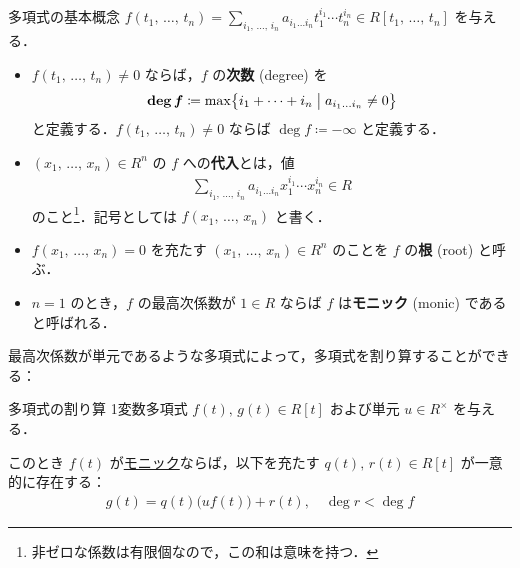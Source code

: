 \documentclass[rep_main]{subfiles}
\begin{document}
\begin{mydef}[label=def:poly-basic]{多項式の基本概念}
    $f(t_1,\, \dots,\, t_n) = \sum_{i_1,\, \dots,\, i_n} a_{i_1 \dots i_n} t_1^{i_1} \cdots t_n^{i_n}  \in R[t_1,\, \dots,\, t_n]$ を与える．
    \begin{itemize}
        \item $f(t_1,\, \dots,\, t_n) \neq 0$ ならば，$f$ の\textbf{次数} (degree) を
        \begin{align}
            \bm{\deg f} \coloneqq \max \bigl\{ i_1 + \cdots + i_n \bigm| a_{i_1 \dots i_n} \neq 0 \bigr\} 
        \end{align}
        と定義する．$f(t_1,\, \dots,\, t_n) \neq 0$ ならば $\deg f \coloneqq -\infty$ と定義する．
        \item $(x_1,\, \dots,\, x_n) \in R^n$ の $f$ への\textbf{代入}とは，値
        \begin{align}
            \sum_{i_1,\, \dots,\, i_n} a_{i_1\dots i_n} x_1^{i_1} \cdots x_n^{i_n} \in R
        \end{align}
        のこと\footnote{非ゼロな係数は有限個なので，この和は意味を持つ．}．記号としては $f(x_1,\, \dots,\, x_n)$ と書く．
        \item $f(x_1,\, \dots,\, x_n) = 0$ を充たす $(x_1,\, \dots,\, x_n) \in R^n$ のことを $f$ の\textbf{根} (root) と呼ぶ．
        \item $n=1$ のとき，$f$ の最高次係数が $1 \in R$ ならば $f$ は\textbf{モニック} (monic) であると呼ばれる．
    \end{itemize}
\end{mydef}

最高次係数が単元であるような多項式によって，多項式を割り算することができる：

\begin{myprop}[label=prop:poly-divide,breakable]{多項式の割り算}
    1変数多項式 $f(t),\, g(t) \in R[t]$ および単元 $u \in R^\times$ を与える．

    このとき $f(t)$ が\hyperref[def:poly-basic]{モニック}ならば，以下を充たす $q(t),\, r(t) \in R[t]$ が一意的に存在する：
    \begin{align}
        g(t) = q(t) \bigl( uf(t) \bigr) + r(t),\quad \deg r < \deg f
    \end{align}
    
\end{myprop}
\end{document}
